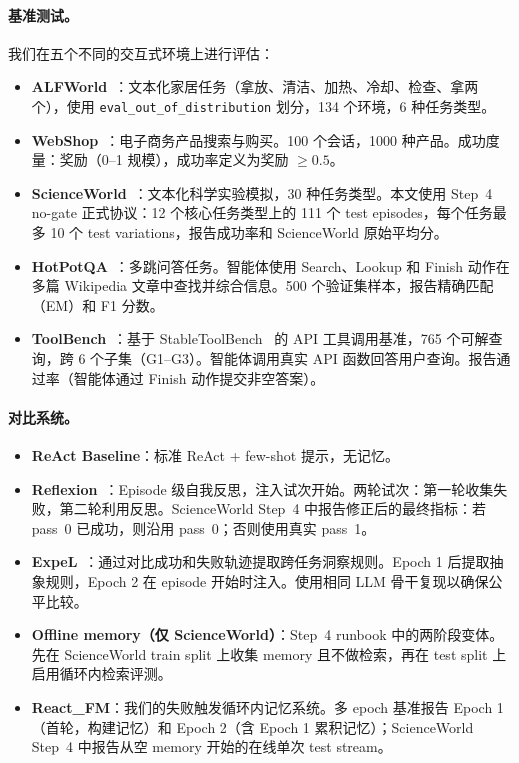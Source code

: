 \documentclass[11pt,a4paper]{article}
\newcommand{\method}{React\_FM}
\begin{document}
\paragraph{基准测试。} 我们在五个不同的交互式环境上进行评估：
\begin{itemize}
    \item \textbf{ALFWorld}~\cite{shridhar2021alfworld}：文本化家居任务（拿放、清洁、加热、冷却、检查、拿两个），使用 \texttt{eval\_out\_of\_distribution} 划分，134 个环境，6 种任务类型。
    \item \textbf{WebShop}~\cite{yao2022webshop}：电子商务产品搜索与购买。100 个会话，1000 种产品。成功度量：奖励（0--1 规模），成功率定义为奖励 $\geq 0.5$。
    \item \textbf{ScienceWorld}~\cite{wang2022scienceworld}：文本化科学实验模拟，30 种任务类型。本文使用 Step~4 no-gate 正式协议：12 个核心任务类型上的 111 个 test episodes，每个任务最多 10 个 test variations，报告成功率和 ScienceWorld 原始平均分。
    \item \textbf{HotPotQA}~\cite{yang2018hotpotqa}：多跳问答任务。智能体使用 Search、Lookup 和 Finish 动作在多篇 Wikipedia 文章中查找并综合信息。500 个验证集样本，报告精确匹配（EM）和 F1 分数。
    \item \textbf{ToolBench}~\cite{qin2023toolllm}：基于 StableToolBench~\cite{guo2024stabletoolbench} 的 API 工具调用基准，765 个可解查询，跨 6 个子集（G1--G3）。智能体调用真实 API 函数回答用户查询。报告通过率（智能体通过 Finish 动作提交非空答案）。
\end{itemize}

\paragraph{对比系统。}
\begin{itemize}
    \item \textbf{ReAct Baseline}：标准 ReAct + few-shot 提示，无记忆。
    \item \textbf{Reflexion}~\cite{shinn2023reflexion}：Episode 级自我反思，注入试次开始。两轮试次：第一轮收集失败，第二轮利用反思。ScienceWorld Step~4 中报告修正后的最终指标：若 pass~0 已成功，则沿用 pass~0；否则使用真实 pass~1。
    \item \textbf{ExpeL}~\cite{zhao2024expel}：通过对比成功和失败轨迹提取跨任务洞察规则。Epoch 1 后提取抽象规则，Epoch 2 在 episode 开始时注入。使用相同 LLM 骨干复现以确保公平比较。
    \item \textbf{Offline memory（仅 ScienceWorld）}：Step~4 runbook 中的两阶段变体。先在 ScienceWorld train split 上收集 memory 且不做检索，再在 test split 上启用循环内检索评测。
    \item \textbf{\method{}}：我们的失败触发循环内记忆系统。多 epoch 基准报告 Epoch 1（首轮，构建记忆）和 Epoch 2（含 Epoch 1 累积记忆）；ScienceWorld Step~4 中报告从空 memory 开始的在线单次 test stream。
\end{itemize}
\end{document}

